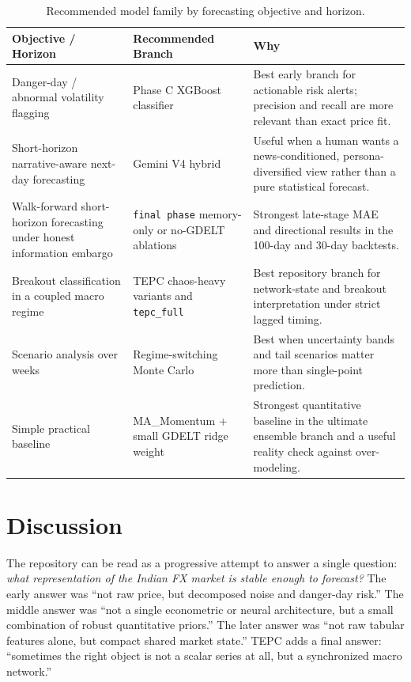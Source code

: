 \documentclass[11pt,a4paper]{article}
\begin{document}
\begin{table}[t]
\centering
\small
\caption{Recommended model family by forecasting objective and horizon.}
\label{tab:recommendations}
\begin{tabular}{p{3.5cm}p{4.8cm}p{6.3cm}}
\toprule
\textbf{Objective / Horizon} & \textbf{Recommended Branch} & \textbf{Why} \\
\midrule
Danger-day / abnormal volatility flagging & Phase C XGBoost classifier & Best early branch for actionable risk alerts; precision and recall are more relevant than exact price fit. \\
Short-horizon narrative-aware next-day forecasting & Gemini V4 hybrid & Useful when a human wants a news-conditioned, persona-diversified view rather than a pure statistical forecast. \\
Walk-forward short-horizon forecasting under honest information embargo & \texttt{final phase} memory-only or no-GDELT ablations & Strongest late-stage MAE and directional results in the 100-day and 30-day backtests. \\
Breakout classification in a coupled macro regime & TEPC chaos-heavy variants and \texttt{tepc\_full} & Best repository branch for network-state and breakout interpretation under strict lagged timing. \\
Scenario analysis over weeks & Regime-switching Monte Carlo & Best when uncertainty bands and tail scenarios matter more than single-point prediction. \\
Simple practical baseline & MA\_Momentum + small GDELT ridge weight & Strongest quantitative baseline in the ultimate ensemble branch and a useful reality check against over-modeling. \\
\bottomrule
\end{tabular}
\end{table}

\section{Discussion}

The repository can be read as a progressive attempt to answer a single question: \textit{what representation of the Indian FX market is stable enough to forecast?} The early answer was ``not raw price, but decomposed noise and danger-day risk.'' The middle answer was ``not a single econometric or neural architecture, but a small combination of robust quantitative priors.'' The later answer was ``not raw tabular features alone, but compact shared market state.'' TEPC adds a final answer: ``sometimes the right object is not a scalar series at all, but a synchronized macro network.''
\end{document}
